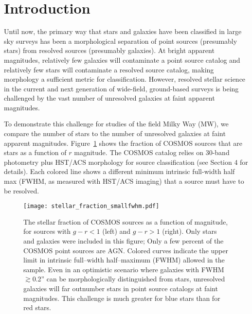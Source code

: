 \documentclass[12pt,preprint]{aastex}
\begin{document}
%
%
\section{Introduction}

Until now, the primary way that stars and galaxies have been
classified in large sky surveys has been a morphological separation
\citep[e.g.,][]{kron80,yee91,vasconcellos11a,henrion11a} of point
sources (presumably stars) from resolved sources (presumably
galaxies).  At bright apparent magnitudes, relatively few galaxies
will contaminate a point source catalog and relatively few stars will
contaminate a resolved source catalog, making morphology a sufficient
metric for classification.  However, resolved stellar science in the
current and next generation of wide-field, ground-based surveys is
being challenged by the vast number of unresolved galaxies at faint
apparent magnitudes.  

To demonstrate this challenge for studies of the field Milky Way (MW),
we compare the number of stars to the number of unresolved galaxies at
faint apparent magnitudes.  Figure~\ref{fig:stellarfraction} shows the
fraction of COSMOS sources that are stars as a function of $r$
magnitude.  The COSMOS catalog \citep[($l,b$) $\sim$ (237,43)
degrees][]{capak07a,scoville07,ilbert09} relies on 30-band photometry
plus HST/ACS morphology for source classification (see Section 4 for
details).  Each colored line shows a different minimum intrinsic
full-width half max (FWHM, as measured with HST/ACS imaging) that a
source must have to be resolved.

\begin{figure}
\centering
\texttt{[image: stellar\_fraction\_smallfwhm.pdf]}
\caption{The stellar fraction of COSMOS sources as a function of
  magnitude, for sources with $g-r<1$ (left) and $g-r>1$ (right).
  Only stars and galaxies were included in this figure; Only a few
  percent of the COSMOS point sources are AGN.  Colored curves
  indicate the upper limit in intrinsic full--width half--maximum
  (FWHM) allowed in the sample.  Even in an optimistic scenario where
  galaxies with FWHM $\gtrsim$0.2'' can be morphologically distinguished
  from stars, unresolved galaxies will far outnumber stars in point
  source catalogs at faint magnitudes.  This challenge is much greater
  for blue stars than for red stars.}
\label{fig:stellarfraction}
\end{figure}
\end{document}

